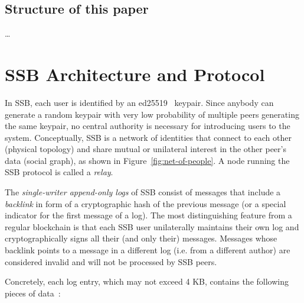 \documentclass[10pt,sigconf]{acmart}
\begin{document}
\subsection*{Structure of this paper}

\ldots


\section{SSB Architecture and Protocol}

In SSB, each user is identified by an ed25519~\cite{bernstein2012high} keypair. Since anybody can generate a random keypair with very low probability of multiple peers generating the same keypair, no central authority is necessary for introducing users to the system. Conceptually, SSB is a network of identities that connect to each other (physical topology) and share mutual or unilateral interest in the other peer's data (social graph), as shown in Figure~\ref{fig:net-of-people}. A node running the SSB protocol is called a \textit{relay}.

The {\em single-writer append-only logs} of SSB consist of  messages that include a {\em backlink} in form of a cryptographic hash of the previous message (or a special indicator for the first message of a log). The most distinguishing feature from a regular blockchain is that each SSB user unilaterally maintains their own log and cryptographically signs all their (and only their) messages. Messages whose backlink points to a message in a different log (i.e. from a different author) are considered invalid and will not be processed by SSB peers.


Concretely, each log entry, which may not exceed 4 KB, contains the following pieces of data~\cite{ssb-spec-messages}:
\end{document}
